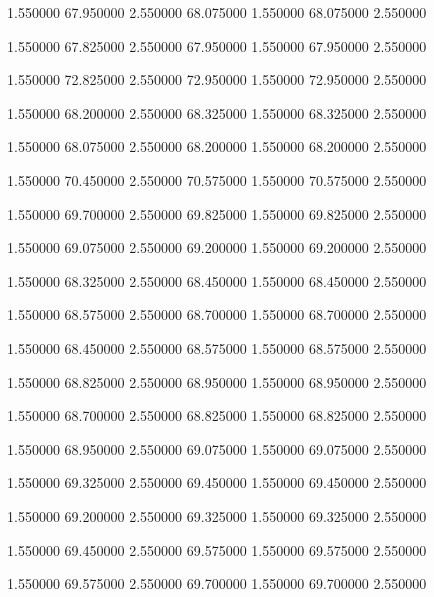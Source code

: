  {1.550000} {67.950000} {2.550000} {68.075000} {1.550000} {68.075000} {2.550000}

 {1.550000} {67.825000} {2.550000} {67.950000} {1.550000} {67.950000} {2.550000}

 {1.550000} {72.825000} {2.550000} {72.950000} {1.550000} {72.950000} {2.550000}

 {1.550000} {68.200000} {2.550000} {68.325000} {1.550000} {68.325000} {2.550000}

 {1.550000} {68.075000} {2.550000} {68.200000} {1.550000} {68.200000} {2.550000}

 {1.550000} {70.450000} {2.550000} {70.575000} {1.550000} {70.575000} {2.550000}

 {1.550000} {69.700000} {2.550000} {69.825000} {1.550000} {69.825000} {2.550000}

 {1.550000} {69.075000} {2.550000} {69.200000} {1.550000} {69.200000} {2.550000}

 {1.550000} {68.325000} {2.550000} {68.450000} {1.550000} {68.450000} {2.550000}

 {1.550000} {68.575000} {2.550000} {68.700000} {1.550000} {68.700000} {2.550000}

 {1.550000} {68.450000} {2.550000} {68.575000} {1.550000} {68.575000} {2.550000}

 {1.550000} {68.825000} {2.550000} {68.950000} {1.550000} {68.950000} {2.550000}

 {1.550000} {68.700000} {2.550000} {68.825000} {1.550000} {68.825000} {2.550000}

 {1.550000} {68.950000} {2.550000} {69.075000} {1.550000} {69.075000} {2.550000}

 {1.550000} {69.325000} {2.550000} {69.450000} {1.550000} {69.450000} {2.550000}

 {1.550000} {69.200000} {2.550000} {69.325000} {1.550000} {69.325000} {2.550000}

 {1.550000} {69.450000} {2.550000} {69.575000} {1.550000} {69.575000} {2.550000}

 {1.550000} {69.575000} {2.550000} {69.700000} {1.550000} {69.700000} {2.550000}

